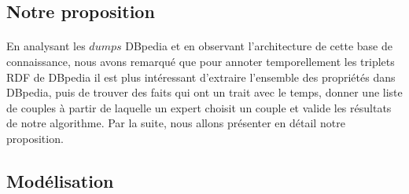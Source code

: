 \subsection{Notre proposition}
\paragraph{}
En analysant les $dumps$ DBpedia et en observant l'architecture de cette base de connaissance, nous avons remarqué que pour annoter temporellement les triplets RDF de DBpedia il est plus intéressant d'extraire l'ensemble des propriétés dans DBpedia, puis de trouver des faits qui ont un trait avec le temps, donner une liste de couples à partir de laquelle un expert choisit un couple et valide les résultats de notre algorithme. Par la suite, nous allons présenter en détail notre proposition.
\subsection{Modélisation}
